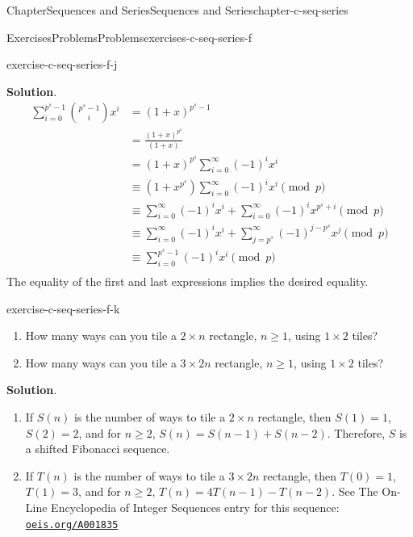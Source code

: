\documentclass[oneside,10pt,]{book}
\newcommand{\blocktitlefont}{\relax}
\numberwithin{equation}{section}
\begin{document}
\begin{chapterptx}{Chapter}{Sequences and Series}{}{Sequences and Series}{}{}{chapter-c-seq-series}
\begin{exercises-section}{Exercises}{Problems}{}{Problems}{}{}{exercises-c-seq-series-f}
\begin{divisionexercise}{9}{}{}{exercise-c-seq-series-f-j}
\par\smallskip%
\noindent\textbf{\blocktitlefont Solution}.\hypertarget{solution-c-seq-series-f-j-c}{}\quad{}%
\begin{equation*}
\begin{split}
\sum_{i=0}^{p^s-1} \binom{p^s-1}{i} x^i  &= (1+x)^{p^s-1}\\
& =\frac{(1+x)^{p^s}}{(1+x)}\\
& =(1+x)^{p^s} \sum_{i=0}^{\infty} (-1)^i x^i\\
& \equiv (1+x^{p^s}) \sum_{i=0}^{\infty} (-1)^i x^i \pmod{p}\\
& \equiv \sum_{i=0}^{\infty}(-1)^i x^i + \sum_{i=0}^{\infty}(-1)^i x^{p^s+i}\pmod{p}\\
& \equiv \sum_{i=0}^{\infty}(-1)^i x^i + \sum_{j=p^s}^{\infty}(-1)^{j-p^s} x^{j}\pmod{p}\\
& \equiv \sum_{i=0}^{p^s-1}(-1)^i x^i \pmod{p}\\
\end{split}
\end{equation*}
The equality of the first and last expressions implies the desired equality.%
\end{divisionexercise}%
\begin{divisionexercise}{10}{}{}{exercise-c-seq-series-f-k}%
%
\begin{enumerate}[label=(\alph*)]
\item{}How many ways can you tile a \(2 \times  n\) rectangle, \(n\geq 1\), using \(1\times 2\) tiles?%
\item{}How many ways can you tile a \(3 \times  2n\) rectangle, \(n\geq 1\), using \(1\times 2\) tiles?%
\end{enumerate}
%
\par\smallskip%
\noindent\textbf{\blocktitlefont Solution}.\hypertarget{solution-c-seq-series-f-k-b}{}\quad{}%
\begin{enumerate}[label=(\alph*)]
\item{}If \(S(n)\) is the number of ways to tile a \(2 \times  n\) rectangle, then \(S(1)=1\), \(S(2)=2\), and for \(n \geq 2\), \(S(n)=S(n-1)+S(n-2)\).  Therefore, \(S\) is a shifted Fibonacci sequence.%
\item{}If \(T(n)\) is the number of ways to tile a \(3 \times  2n\) rectangle, then \(T(0)=1\), \(T(1)=3\), and for \(n \geq 2\), \(T(n)=4 T(n-1)- T(n-2)\). See The On-Line Encyclopedia of Integer Sequences entry for this sequence: \href{https://oeis.org/A001835}{\nolinkurl{oeis.org/A001835}}%
\par

\end{enumerate}
\end{divisionexercise}
\end{exercises-section}
\end{chapterptx}
\end{document}
